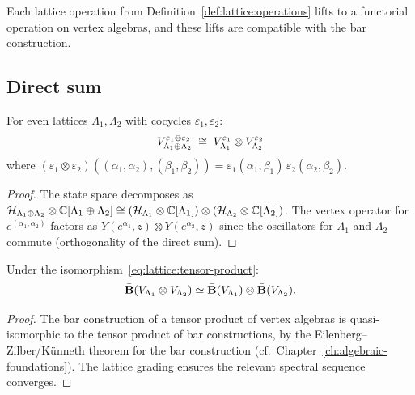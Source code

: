 Each lattice operation from
Definition~\ref{def:lattice:operations} lifts to a functorial operation
on vertex algebras, and these lifts are compatible with the bar
construction.

\subsection{Direct sum}

\begin{theorem}
\label{thm:lattice:direct-sum}
For even lattices $\Lambda_1, \Lambda_2$ with cocycles
$\varepsilon_1, \varepsilon_2$:
\begin{equation}\label{eq:lattice:tensor-product}
V_{\Lambda_1 \oplus \Lambda_2}^{\varepsilon_1 \otimes \varepsilon_2}
\;\cong\;
V_{\Lambda_1}^{\varepsilon_1}
\otimes V_{\Lambda_2}^{\varepsilon_2}
\end{equation}
where $(\varepsilon_1 \otimes \varepsilon_2)
((\alpha_1,\alpha_2),(\beta_1,\beta_2)) =
\varepsilon_1(\alpha_1,\beta_1)\,\varepsilon_2(\alpha_2,\beta_2)$.
\end{theorem}

\begin{proof}
The state space decomposes as
$\mathcal{H}_{\Lambda_1 \oplus \Lambda_2} \otimes \mathbb{C}[\Lambda_1 \oplus \Lambda_2]
\cong (\mathcal{H}_{\Lambda_1} \otimes \mathbb{C}[\Lambda_1]) \otimes
(\mathcal{H}_{\Lambda_2} \otimes \mathbb{C}[\Lambda_2])$.
The vertex operator for $e^{(\alpha_1,\alpha_2)}$ factors as
$Y(e^{\alpha_1}, z) \otimes Y(e^{\alpha_2}, z)$
since the oscillators for $\Lambda_1$ and $\Lambda_2$ commute
(orthogonality of the direct sum).
\end{proof}

\begin{corollary}\label{cor:lattice:kunneth}
Under the isomorphism~\eqref{eq:lattice:tensor-product}:
\[
\bar{\mathbf{B}}(V_{\Lambda_1} \otimes V_{\Lambda_2})
\simeq
\bar{\mathbf{B}}(V_{\Lambda_1})
\otimes \bar{\mathbf{B}}(V_{\Lambda_2}).
\]
\end{corollary}

\begin{proof}
The bar construction of a tensor product of vertex algebras is
quasi-isomorphic to the tensor product of bar constructions, by
the Eilenberg--Zilber/K\"unneth theorem for the bar construction
(cf.\ Chapter~\ref{ch:algebraic-foundations}). The lattice grading
ensures the relevant spectral sequence converges.
\end{proof}

